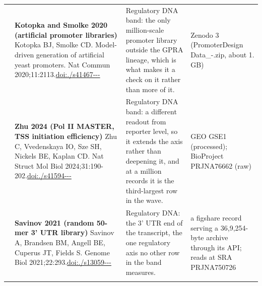 \begin{landscape}
\begin{longtable}{@{}r@{\hspace{4pt}} L{78mm} L{72mm} L{76mm}@{}}
 & \textbf{Kotopka and Smolke 2020 (artificial promoter libraries)} \newline Kotopka BJ, Smolke CD. Model-driven generation of artificial yeast promoters. Nat Commun 2020;11:2113.\newline \href{https://doi.org/10.1038/s41467-020-15977-4}{doi:./\allowbreak s41467---} & Regulatory DNA band: the only million-scale promoter library outside the GPRA lineage, which is what makes it a check on it rather than more of it. & Zenodo 3 (\allowbreak Promoter\allowbreak  Design \allowbreak Data\_-.\allowbreak zip, ab\allowbreak out 1. GB) \\
 & \textbf{Zhu 2024 (Pol II MASTER, TSS initiation efficiency)} \newline Zhu C, Vvedenskaya IO, Sze SH, Nickels BE, Kaplan CD. Nat Struct Mol Biol 2024;31:190-202.\newline \href{https://doi.org/10.1038/s41594-023-01171-9}{doi:./\allowbreak s41594---} & Regulatory DNA band: a different readout from reporter level, so it extends the axis rather than deepening it, and at a million records it is the third-largest row in the wave. & GEO GSE1 (p\allowbreak rocessed\allowbreak ); BioPr\allowbreak oject PR\allowbreak JNA76662 (raw) \\
 & \textbf{Savinov 2021 (random 50-mer 3' UTR library)} \newline Savinov A, Brandsen BM, Angell BE, Cuperus JT, Fields S. Genome Biol 2021;22:293.\newline \href{https://doi.org/10.1186/s13059-021-02509-6}{doi:./\allowbreak s13059---} & Regulatory DNA: the 3' UTR end of the transcript, the one regulatory axis no other row in the band measures. & a figsha\allowbreak re recor\allowbreak d servin\allowbreak g a 36,9,254-\allowbreak byte ar\allowbreak chive th\allowbreak rough it\allowbreak s API; r\allowbreak eads at \allowbreak SRA PRJN\allowbreak A750726 \\
\addlinespace[5pt]

\end{longtable}
\end{landscape}

